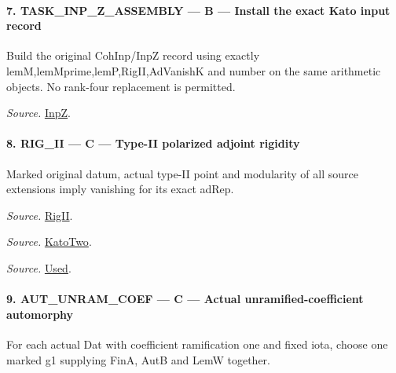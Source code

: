 \paragraph{7. TASK\_\allowbreak INP\_\allowbreak Z\_\allowbreak ASSEMBLY — B — Install the exact Kato input record}

Build the original CohInp/InpZ record using exactly lemM,lemMprime,lemP,RigII,AdVanishK and number on the same arithmetic objects. No rank-four replacement is permitted.

\emph{Source.} \href{https://github.com/CocoSgt/riemann-hypothesis-lean/blob/7cbf7a0c32fca1badf05931879a37c3f8a2b03b4/src/Development/AutomorphicArithmetic/AutomorphicVarieties/ModularityArgument/KatoQuadraticCharacters/KatoTwoOfUseN.lean#L55-L61}{InpZ}.



\paragraph{8. RIG\_\allowbreak II — C — Type-II polarized adjoint rigidity}

Marked original datum, actual type-II point and modularity of all source extensions imply vanishing for its exact adRep.

\emph{Source.} \href{https://github.com/CocoSgt/riemann-hypothesis-lean/blob/7cbf7a0c32fca1badf05931879a37c3f8a2b03b4/src/Development/AutomorphicArithmetic/AutomorphicVarieties/ModularityArgument/KatoQuadraticCharacters/KatoTwoOfUseN.lean#L49-L53}{RigII}.

\emph{Source.} \href{https://github.com/CocoSgt/riemann-hypothesis-lean/blob/7cbf7a0c32fca1badf05931879a37c3f8a2b03b4/src/Development/AutomorphicArithmetic/AutomorphicVarieties/ModularityArgument/KatoQuadraticCharacters/KatoTwoOfUseN.lean#L43-L47}{KatoTwo}.

\emph{Source.} \href{https://github.com/CocoSgt/riemann-hypothesis-lean/blob/7cbf7a0c32fca1badf05931879a37c3f8a2b03b4/src/Development/AutomorphicArithmetic/AutomorphicVarieties/ModularityArgument/KatoQuadraticCharacters/KatoTwoOfUseN.lean#L11-L41}{Used}.



\paragraph{9. AUT\_\allowbreak UNRAM\_\allowbreak COEF — C — Actual unramified-coefficient automorphy}

For each actual Dat with coefficient ramification one and fixed iota, choose one marked g1 supplying FinA, AutB and LemW together.


